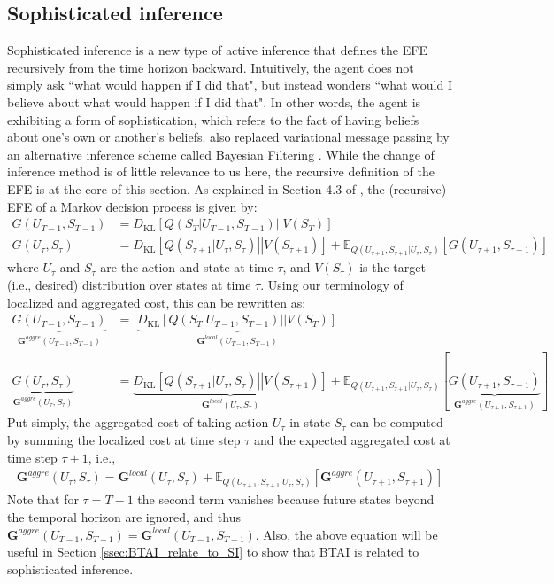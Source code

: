 \documentclass[twoside,11pt]{article}
\newcommand{\kl}[2]{D_{\mathrm{KL}} \left[ \left. \left. #1 \right|\right| #2 \right] }
\begin{document}
\subsection{Sophisticated inference}

Sophisticated inference \citep{Sophisticated_INF} is a new type of active inference that defines the EFE recursively from the time horizon backward. Intuitively, the agent does not simply ask ``what would happen if I did that", but instead wonders ``what would I believe about what would happen if I did that". In other words, the agent is exhibiting a form of sophistication, which refers to the fact of having beliefs about one's own or another's beliefs. \citet{Sophisticated_INF} also replaced variational message passing by an alternative inference scheme called Bayesian Filtering \citep{BAYESIAN_FILTERING}. While the change of inference method is of little relevance to us here, the recursive definition of the EFE is at the core of this section. As explained in Section 4.3 of \citet{dacosta2020relationship}, the (recursive) EFE of a Markov decision process is given by:
\begin{align}
G(U_{T-1},S_{T-1})&= \kl{Q(S_{T}|U_{T-1},S_{T-1})}{V(S_{T})}\\
G(U_\tau,S_\tau)&= \kl{Q(S_{\tau+1}|U_\tau,S_\tau)}{V(S_{\tau+1})} + \mathbb{E}_{Q(U_{\tau+1},S_{\tau+1}|U_\tau,S_\tau)}[G(U_{\tau+1},S_{\tau+1})]\label{eq:recu_def_of_efe_in_SI}
\end{align}
where $U_\tau$ and $S_\tau$ are the action and state at time $\tau$, and $V(S_{\tau})$ is the target (i.e., desired) distribution over states at time $\tau$. Using our terminology of localized and aggregated cost, this can be rewritten as:
\begin{align}
\underbrace{G(U_{T-1},S_{T-1})}_{\bm{G}^{aggre}(U_{T-1},S_{T-1})} &= \,\,\underbrace{\kl{Q(S_{T}|U_{T-1},S_{T-1})}{V(S_{T})}}_{\bm{G}^{local}(U_{T-1},S_{T-1})} \\
\underbrace{G(U_\tau,S_\tau)}_{\bm{G}^{aggre}(U_{\tau},S_{\tau})} &= \underbrace{\kl{Q(S_{\tau+1}|U_\tau,S_\tau)}{V(S_{\tau+1})}}_{\bm{G}^{local}(U_{\tau},S_{\tau})} + \mathbb{E}_{Q(U_{\tau+1},S_{\tau+1}|U_\tau,S_\tau)}[\underbrace{G(U_{\tau+1},S_{\tau+1})}_{\bm{G}^{aggre}(U_{\tau+1},S_{\tau+1})}]
\end{align}
Put simply, the aggregated cost of taking action $U_\tau$ in state $S_\tau$ can be computed by summing the localized cost at time step $\tau$ and the expected aggregated cost at time step $\tau + 1$, i.e.,
\begin{align}\label{abstract_SI}
\bm{G}^{aggre}(U_{\tau},S_{\tau}) = \bm{G}^{local}(U_{\tau},S_{\tau}) + \mathbb{E}_{Q(U_{\tau+1},S_{\tau+1}|U_\tau,S_\tau)}[\bm{G}^{aggre}(U_{\tau+1},S_{\tau+1})]
\end{align}
Note that for $\tau = T - 1$ the second term vanishes because future states beyond the temporal horizon are ignored, and thus $\bm{G}^{aggre}(U_{T-1},S_{T-1}) = \bm{G}^{local}(U_{T-1},S_{T-1})$. Also, the above equation will be useful in Section \ref{ssec:BTAI_relate_to_SI} to show that BTAI is related to sophisticated inference.
\end{document}
